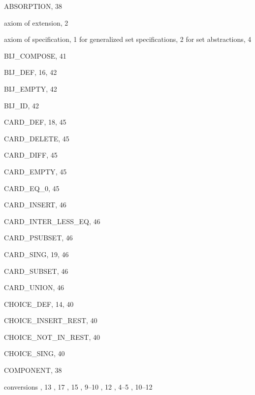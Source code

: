 \begin{theindex}

  \item {\ptt ABSORPTION}, 38
  \item axiom of extension, 2
  \item axiom of specification, 1
    \subitem for generalized set specifications, 2
    \subitem for set abstractions, 4

  \indexspace

  \item {\ptt BIJ\_COMPOSE}, 41
  \item {\ptt BIJ\_DEF}, 16, 42
  \item {\ptt BIJ\_EMPTY}, 42
  \item {\ptt BIJ\_ID}, 42

  \indexspace

  \item {\ptt CARD\_DEF}, 18, 45
  \item {\ptt CARD\_DELETE}, 45
  \item {\ptt CARD\_DIFF}, 45
  \item {\ptt CARD\_EMPTY}, 45
  \item {\ptt CARD\_EQ\_0}, 45
  \item {\ptt CARD\_INSERT}, 46
  \item {\ptt CARD\_INTER\_LESS\_EQ}, 46
  \item {\ptt CARD\_PSUBSET}, 46
  \item {\ptt CARD\_SING}, 19, 46
  \item {\ptt CARD\_SUBSET}, 46
  \item {\ptt CARD\_UNION}, 46
  \item {\ptt CHOICE\_DEF}, 14, 40
  \item {\ptt CHOICE\_INSERT\_REST}, 40
  \item {\ptt CHOICE\_NOT\_IN\_REST}, 40
  \item {\ptt CHOICE\_SING}, 40
  \item {\ptt COMPONENT}, 38
  \item conversions
    , 13
    , 17
    , 15
    , 9--10
    , 12
    , 4--5
    , 10--12

  \indexspace


\end{theindex}
